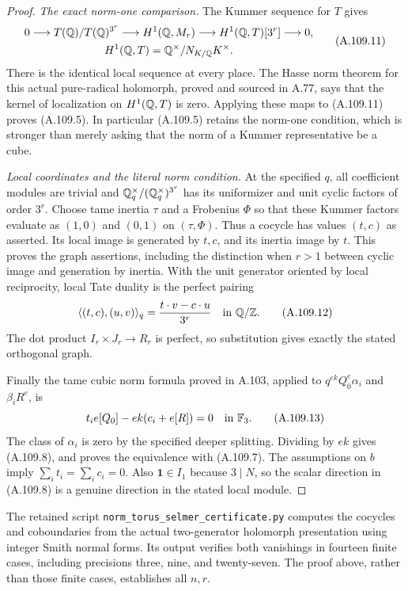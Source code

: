\begin{proof}
\emph{The exact norm-one comparison.}
The Kummer sequence for $T$ gives
\[
 \begin{gathered}
 0\longrightarrow T(\mathbb Q)/T(\mathbb Q)^{3^r}
 \longrightarrow H^1(\mathbb Q,M_r)
 \longrightarrow H^1(\mathbb Q,T)[3^r]\longrightarrow0,\\
 H^1(\mathbb Q,T)=\mathbb Q^\times/N_{K/\mathbb Q}K^\times.
 \end{gathered}
 \tag{A.109.11}
\]
There is the identical local sequence at every place.
The Hasse norm theorem for this actual pure-radical holomorph,
proved and sourced in A.77, says that the kernel of localization
on $H^1(\mathbb Q,T)$ is zero.
Applying these maps to (A.109.11) proves (A.109.5).
In particular (A.109.5) retains the norm-one condition, which is
stronger than merely asking that the norm of a Kummer representative
be a cube.

\emph{Local coordinates and the literal norm condition.}
At the specified $q$, all coefficient modules are trivial and
$\mathbb Q_q^\times/(\mathbb Q_q^\times)^{3^r}$ has its uniformizer and unit
cyclic factors of order $3^r$.
Choose tame inertia $\tau$ and a Frobenius $\Phi$ so that these
Kummer factors evaluate as $(1,0)$ and $(0,1)$ on $(\tau,\Phi)$.
Thus a cocycle has values $(t,c)$ as asserted.
Its local image is generated by $t,c$, and its inertia image by $t$.
This proves the graph assertions, including the distinction when
$r>1$ between cyclic image and generation by inertia.
With the unit generator oriented by local reciprocity, local Tate
duality is the perfect pairing
\[
 \langle(t,c),(u,v)\rangle_q
                 =\frac{t\cdot v-c\cdot u}{3^r}
                 \quad\text{in }\mathbb Q/\mathbb Z.
 \tag{A.109.12}
\]
The dot product $I_r\times J_r\to R_r$ is perfect, so substitution
gives exactly the stated orthogonal graph.

Finally the tame cubic norm formula proved in A.103, applied to
$q^{ek}Q_0^e\alpha_i$ and $\beta_iR^e$, is
\[
        t_i e[Q_0]-ek(c_i+e[R])=0\quad\text{in }\mathbb F_3.
 \tag{A.109.13}
\]
The class of $\alpha_i$ is zero by the specified deeper splitting.
Dividing by $ek$ gives (A.109.8), and proves the equivalence with
(A.109.7).  The assumptions on $b$ imply
$\sum_i t_i=\sum_i c_i=0$.
Also $\mathbf1\in I_1$ because $3\mid N$, so the scalar direction
in (A.109.8) is a genuine direction in the stated local module.
\end{proof}

The retained script \texttt{norm\_torus\_selmer\_certificate.py}
computes the cocycles and coboundaries from the actual two-generator
holomorph presentation using integer Smith normal forms.
Its output verifies both vanishings in fourteen finite cases,
including precisions three, nine, and twenty-seven.
The proof above, rather than those finite cases, establishes all
$n,r$.
